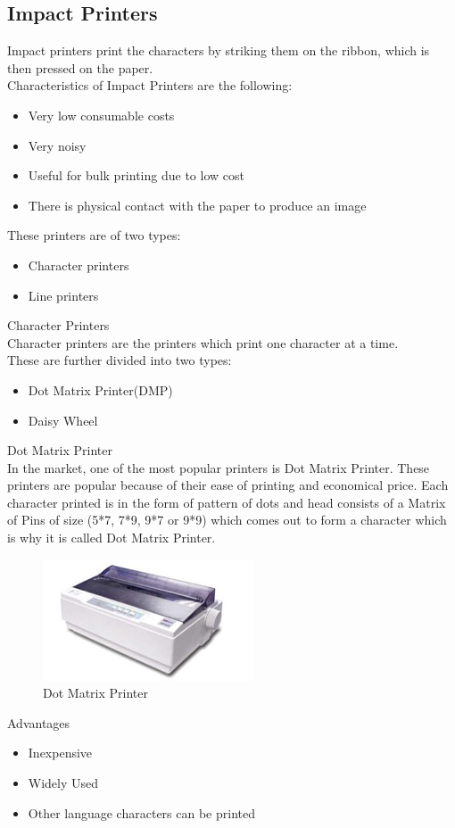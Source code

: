 \documentclass[11pt,a4paper,twoside]{article}
\begin{document}
\subsection{Impact Printers}
Impact printers print the characters by striking them on the ribbon, which is then pressed on the paper. \\
Characteristics of Impact Printers are the following:  
\begin{itemize}
    \item Very low consumable costs
\item Very noisy
\item Useful for bulk printing due to low cost
\item There is physical contact with the paper to produce an image 
\end{itemize}
These printers are of two types:
\begin{itemize}
    \item Character printers
\item Line printers
\end{itemize}
Character Printers \\
Character printers are the printers which print one character at a time. \\
These are further divided into two types: 
\begin{itemize}
    \item Dot Matrix Printer(DMP)
\item Daisy Wheel
\end{itemize}
Dot Matrix Printer \\
In the market, one of the most popular printers is Dot Matrix Printer. These printers are popular because of their ease of printing and economical price. Each character printed is in the form of pattern of dots and head consists of a Matrix of Pins of size (5*7, 7*9, 9*7 or 9*9) which comes out to form a character which is why it is called Dot Matrix Printer.
\begin{figure}[H]
\centering \includegraphics[scale=1]{Fig 15.jpg}
\caption{Dot Matrix Printer}
\end{figure}
Advantages  
\begin{itemize}
    \item Inexpensive  
\item Widely Used
\item Other language characters can be printed
\end{itemize}
\end{document}
